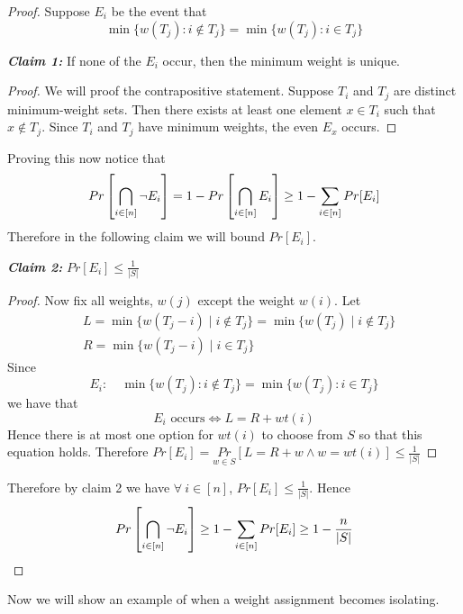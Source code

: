 \begin{proof}
    Suppose $E_i$ be the event that $$\min\{w(T_j)\colon i\notin T_j\}=\min \{w(T_j)\colon i\in T_j\} $$\parinf\vspace*{2mm}

    \textbf{\textit{Claim 1:}} If none of the $E_i$ occur, then the minimum weight is unique. 
    
    \begin{proof}
        We will proof the contrapositive statement. Suppose $T_i$ and $T_j$ are distinct minimum-weight sets. Then there exists at least one element $x\in T_i$ such that $x\notin T_j$. Since $T_i$ and $T_j$ have minimum weights, the even $E_x$ occurs. 
    \end{proof}\vspace*{2mm}\parinn

    Proving this now notice that $$Pr\left[ \bigcap\limits_{i\in [n]} \neg E_i \right]=1-Pr\left[\bigcap\limits_{i\in[n]} E_i\right]\geq 1-\sum\limits_{i\in [n]}Pr[E_i]$$Therefore in the following claim we will bound $Pr[E_i]$. \parinf\vspace*{2mm}

    \textbf{\textit{Claim 2:}} $Pr[E_i]\leq \frac{1}{|S|}$ 
    
    \begin{proof}
        Now fix all weights, $w(j)$ except the weight $w(i)$. Let 
        \begin{align*}
        &L =\min\{w(T_j-i)\mid i\notin T_j\}=\min\{w(T_j)\mid i\notin T_j\}\\
         &R =\min \{w(T_j-i)\mid i\in T_j \}
        \end{align*}
        Since $$E_i:\quad \min\{w(T_j)\colon i\notin T_j\}=\min \{w(T_j)\colon i\in T_j\} $$
        we have that $$ E_i\text{ occurs}\iff L=R+wt(i)$$Hence there is at most  one option for $wt(i)$ to choose from $S$ so that this equation holds. Therefore $Pr[E_i]=\underset{w\in S }{Pr} [L=R+w\wedge w=wt(i)]\leq \frac1{|S|}$
    \end{proof}

Therefore by claim 2 we have $\forall\ i\in [n]$, $Pr[E_i]\leq\frac{1}{|S|}$. Hence $$Pr\left[ \bigcap\limits_{i\in[n]} \neg E_i \right]\geq 1-\sum\limits_{i\in[n]}^{} Pr[E_i]\geq 1-\frac{n}{|S|}$$ 
\end{proof}

Now we will show an example of when  a weight assignment becomes isolating. 


